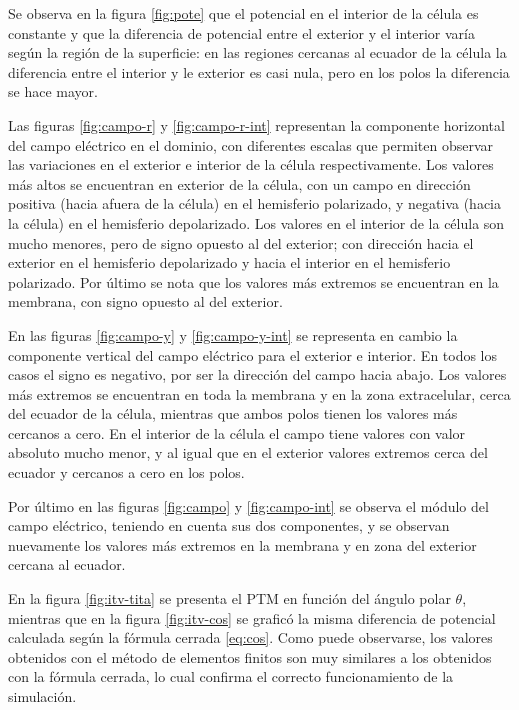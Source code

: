 Se observa en la figura \ref{fig:pote} que el potencial en el interior de la célula es constante y que la diferencia de potencial entre el exterior y el interior varía según la región de la superficie: en las regiones cercanas al ecuador de la célula la diferencia entre el interior y le exterior es casi nula, pero en los polos la diferencia se hace mayor. 

Las figuras \ref{fig:campo-r} y \ref{fig:campo-r-int} representan la componente horizontal del campo eléctrico en el dominio, con diferentes escalas que permiten observar las variaciones en el exterior e interior de la célula respectivamente. Los valores más altos se encuentran en exterior de la célula, con un campo en dirección positiva (hacia afuera de la célula) en el hemisferio polarizado, y negativa (hacia la célula) en el hemisferio depolarizado. Los valores en el interior de la célula son mucho menores, pero de signo opuesto al del exterior; con dirección hacia el exterior en el hemisferio depolarizado y hacia el interior en el hemisferio polarizado. Por último se nota que los valores más extremos se encuentran en la membrana, con signo opuesto al del exterior. 

En las figuras \ref{fig:campo-y} y \ref{fig:campo-y-int} se representa en cambio la componente vertical del campo eléctrico para el exterior e interior. En todos los casos el signo es negativo, por ser la dirección del campo hacia abajo. Los valores más extremos se encuentran en toda la membrana y en la zona extracelular, cerca del ecuador de la célula, mientras que ambos polos tienen los valores más cercanos a cero. En el interior de la célula el campo tiene valores con valor absoluto mucho menor, y al igual que en el exterior valores extremos cerca del ecuador y cercanos a cero en los polos.


Por último en las figuras \ref{fig:campo} y \ref{fig:campo-int} se observa el módulo del campo eléctrico, teniendo en cuenta sus dos componentes, y se observan nuevamente los valores más extremos en la membrana y en zona del exterior cercana al ecuador.

En la figura \ref{fig:itv-tita} se presenta el PTM en función del ángulo polar $\theta$, mientras que en la figura \ref{fig:itv-cos} se graficó la misma diferencia de potencial calculada según la fórmula cerrada \ref{eq:cos}. Como puede observarse, los valores obtenidos con el método de elementos finitos son muy similares a los obtenidos con la fórmula cerrada, lo cual confirma el correcto funcionamiento de la simulación. 

